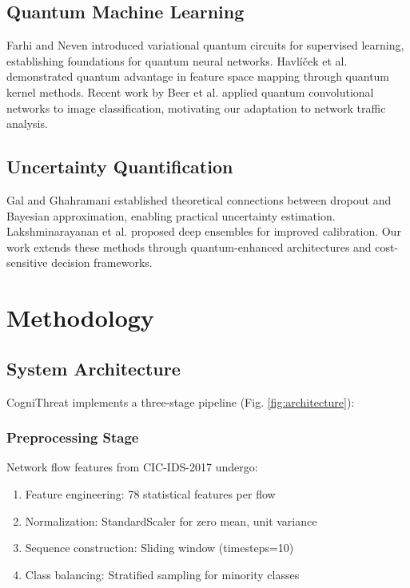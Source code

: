 \documentclass[conference]{IEEEtran}
\begin{document}
\subsection{Quantum Machine Learning}
Farhi and Neven \cite{ref6} introduced variational quantum circuits for supervised learning, establishing foundations for quantum neural networks. Havlíček et al. \cite{ref7} demonstrated quantum advantage in feature space mapping through quantum kernel methods. Recent work by Beer et al. \cite{ref8} applied quantum convolutional networks to image classification, motivating our adaptation to network traffic analysis.

\subsection{Uncertainty Quantification}
Gal and Ghahramani \cite{ref9} established theoretical connections between dropout and Bayesian approximation, enabling practical uncertainty estimation. Lakshminarayanan et al. \cite{ref10} proposed deep ensembles for improved calibration. Our work extends these methods through quantum-enhanced architectures and cost-sensitive decision frameworks.

\section{Methodology}

\subsection{System Architecture}
CogniThreat implements a three-stage pipeline (Fig. \ref{fig:architecture}):

\subsubsection{Preprocessing Stage}
Network flow features from CIC-IDS-2017 undergo:
\begin{enumerate}
    \item Feature engineering: 78 statistical features per flow
    \item Normalization: StandardScaler for zero mean, unit variance
    \item Sequence construction: Sliding window (timesteps=10)
    \item Class balancing: Stratified sampling for minority classes
\end{enumerate}
\end{document}
